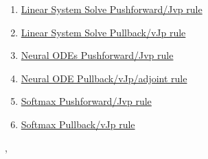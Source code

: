 \documentclass[11pt]{article}
\renewcommand{\today}{\shortmonthname[\the\month] \the \day,  \the\year}
\begin{document}
\begin{enumerate}
	\item \href{https://mp.weixin.qq.com/s/f1gMdPYSvnYaELFOBT_DZg}{Linear System Solve Pushforward/Jvp rule}	%
	\item \href{https://mp.weixin.qq.com/s/CxJSw4VGs_DfzGHdMnup6w}{Linear System Solve Pullback/vJp rule}	%
	\item \href{https://mp.weixin.qq.com/s/A2tRP9eoNR2KOUql23pxbA}{Neural ODEs Pushforward/Jvp rule}	%
	\item \href{https://mp.weixin.qq.com/s/YfNgLM-V3p-k7BwDa8O0ow}{Neural ODE Pullback/vJp/adjoint rule}	%
	\item \href{https://mp.weixin.qq.com/s/0s_Qxcbx4sDbpXq-mNvkcQ}{Softmax Pushforward/Jvp rule}	%
	\item \href{https://mp.weixin.qq.com/s/YKV0lFC3gROaCXCcz-NZWQ}{Softmax Pullback/vJp rule}	%
\end{enumerate}



%
\begin{flushright}
	\tiny \today 
\end{flushright}
\end{document}
